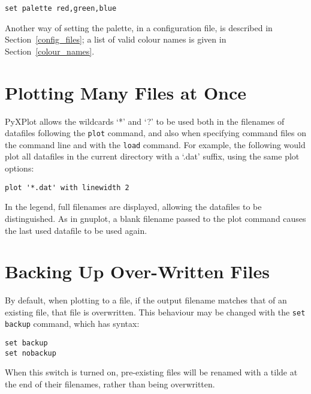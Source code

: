 \begin{verbatim}
set palette red,green,blue
\end{verbatim}

Another way of setting the palette, in a configuration file, is described in
Section~\ref{config_files}; a list of valid colour names is given in
Section~\ref{colour_names}.

\section{Plotting Many Files at Once}


PyXPlot allows the wildcards `*' and `?' to be used both in the filenames of
datafiles following the {\tt plot} command, and also when specifying command
files on the command line and with the {\tt load} command. For example, the
following would plot all datafiles in the current directory with a `.dat'
suffix, using the same plot options:

\begin{verbatim}
plot '*.dat' with linewidth 2
\end{verbatim}

In the legend, full filenames are displayed, allowing the datafiles to be
distinguished.  As in gnuplot, a blank filename passed to the plot command
causes the last used datafile to be used again.

\section{Backing Up Over-Written Files}

\label{filebackup}

By default, when plotting to a file, if the output filename matches that of
an existing file, that file is overwritten. This behaviour may be changed with
the {\tt set backup} command, which has syntax:

\begin{verbatim}
set backup
set nobackup
\end{verbatim}

When this switch is turned on, pre-existing files will be renamed with a tilde
at the end of their filenames, rather than being overwritten.

